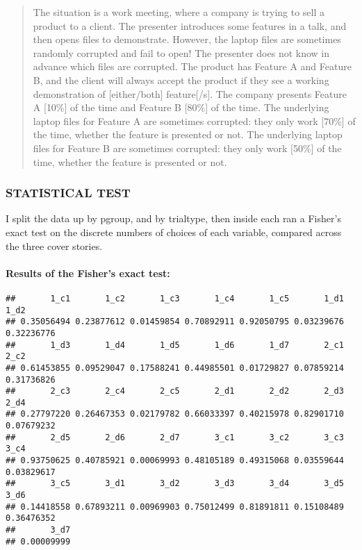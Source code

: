 \documentclass[
]{article}
\newenvironment{Shaded}{\begin{snugshade}}{\end{snugshade}}
\newcommand{\ConstantTok}[1]{\textcolor[rgb]{0.56,0.35,0.01}{#1}}
\newcommand{\ControlFlowTok}[1]{\textcolor[rgb]{0.13,0.29,0.53}{\textbf{#1}}}
\newcommand{\FunctionTok}[1]{\textcolor[rgb]{0.13,0.29,0.53}{\textbf{#1}}}
\newcommand{\NormalTok}[1]{#1}
\newcommand{\OtherTok}[1]{\textcolor[rgb]{0.56,0.35,0.01}{#1}}
\newcommand{\SpecialCharTok}[1]{\textcolor[rgb]{0.81,0.36,0.00}{\textbf{#1}}}
\begin{document}
\begin{quote}
The situation is a work meeting, where a company is trying to sell a
product to a client. The presenter introduces some features in a talk,
and then opens files to demonstrate. However, the laptop files are
sometimes randomly corrupted and fail to open! The presenter does not
know in advance which files are corrupted. The product has Feature A and
Feature B, and the client will always accept the product if they see a
working demonstration of {[}either/both{]} feature{[}/s{]}. The company
presents Feature A {[}10\%{]} of the time and Feature B {[}80\%{]} of
the time. The underlying laptop files for Feature A are sometimes
corrupted: they only work {[}70\%{]} of the time, whether the feature is
presented or not. The underlying laptop files for Feature B are
sometimes corrupted: they only work {[}50\%{]} of the time, whether the
feature is presented or not.
\end{quote}

\subsubsection{STATISTICAL TEST}\label{statistical-test}

I split the data up by pgroup, and by trialtype, then inside each ran a
Fisher's exact test on the discrete numbers of choices of each variable,
compared across the three cover stories.

\paragraph{Results of the Fisher's exact
test:}\label{results-of-the-fishers-exact-test}

\begin{Shaded}
\end{Shaded}

\begin{verbatim}
##       1_c1       1_c2       1_c3       1_c4       1_c5       1_d1       1_d2 
## 0.35056494 0.23877612 0.01459854 0.70892911 0.92050795 0.03239676 0.32236776 
##       1_d3       1_d4       1_d5       1_d6       1_d7       2_c1       2_c2 
## 0.61453855 0.09529047 0.17588241 0.44985501 0.01729827 0.07859214 0.31736826 
##       2_c3       2_c4       2_c5       2_d1       2_d2       2_d3       2_d4 
## 0.27797220 0.26467353 0.02179782 0.66033397 0.40215978 0.82901710 0.07679232 
##       2_d5       2_d6       2_d7       3_c1       3_c2       3_c3       3_c4 
## 0.93750625 0.40785921 0.00069993 0.48105189 0.49315068 0.03559644 0.03829617 
##       3_c5       3_d1       3_d2       3_d3       3_d4       3_d5       3_d6 
## 0.14418558 0.67893211 0.00969903 0.75012499 0.81891811 0.15108489 0.36476352 
##       3_d7 
## 0.00009999
\end{verbatim}
\end{document}

